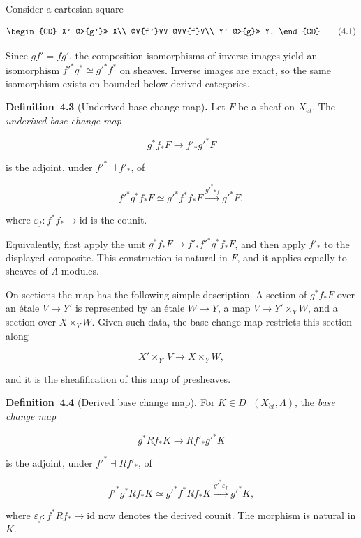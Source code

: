 \documentclass[11pt]{article}
\newenvironment{bpstatement}[2]{\par\addvspace{0.6\baselineskip}\noindent\textbf{#1}#2\textbf{.}\enspace\ignorespaces}
  {\par\addvspace{0.4\baselineskip}}
\begin{document}
\label{bp294}%
Consider a cartesian square

\[
\begin{CD}
X' @>{g'}>> X\\
@V{f'}VV @VV{f}V\\
Y' @>{g}>> Y.
\end{CD}
\tag{4.1}
\]

Since \(gf'=fg'\), the composition isomorphisms of inverse images yield an isomorphism \(f'^*g^*\simeq g'^*f^*\) on sheaves. Inverse images are exact, so the same isomorphism exists on bounded below derived categories.

\label{bp295}%
\begin{bpstatement}{Definition~4.3}{ (Underived base change map)}
Let \(F\) be a sheaf on \(X_{\acute{e}t}\). The \emph{underived base change map}

\[
g^*f_*F\longrightarrow f'_*g'^*F
\tag{4.2}
\]

is the adjoint, under \(f'^*\dashv f'_*\), of

\[
f'^*g^*f_*F
\simeq g'^*f^*f_*F
\xrightarrow{g'^*\varepsilon_f}g'^*F,
\]

where \(\varepsilon_f:f^*f_*\to\mathrm{id}\) is the counit.
\end{bpstatement}

\label{bp296}%
Equivalently, first apply the unit \(g^*f_*F\to f'_*f'^*g^*f_*F\), and then apply \(f'_*\) to the displayed composite. This construction is natural in \(F\), and it applies equally to sheaves of \(\Lambda\)-modules.

On sections the map has the following simple description. A section of \(g^*f_*F\) over an étale \(V\to Y'\) is represented by an étale \(W\to Y\), a map \(V\to
Y'\times_YW\), and a section over \(X\times_YW\). Given such data, the base change map restricts this section along

\[
X'\times_{Y'}V\longrightarrow X\times_YW,
\]

and it is the sheafification of this map of presheaves.

\label{bp297}%
\begin{bpstatement}{Definition~4.4}{ (Derived base change map)}
For \(K\in D^+(X_{\acute{e}t},\Lambda)\), the \emph{base change map}

\[
g^*Rf_*K\longrightarrow Rf'_*g'^*K
\tag{4.3}
\]

is the adjoint, under \(f'^*\dashv Rf'_*\), of

\[
f'^*g^*Rf_*K
\simeq g'^*f^*Rf_*K
\xrightarrow{g'^*\varepsilon_f}g'^*K,
\]

where \(\varepsilon_f:f^*Rf_*\to\mathrm{id}\) now denotes the derived counit. The morphism is natural in \(K\).
\end{bpstatement}
\end{document}
